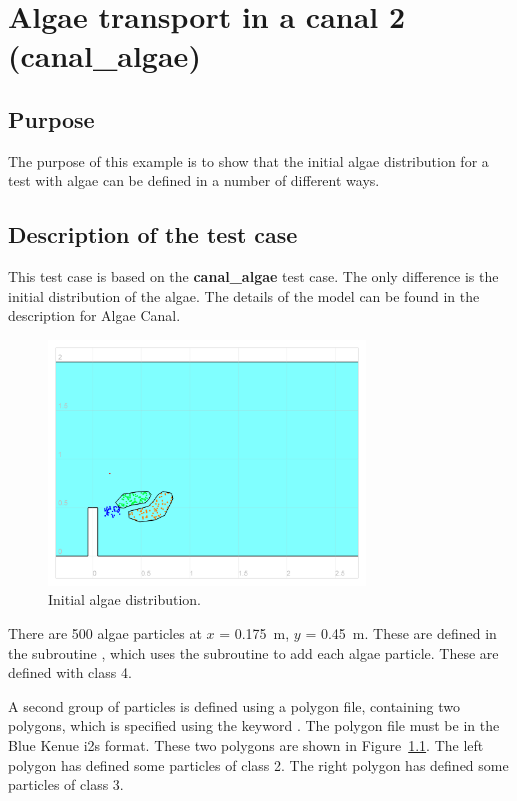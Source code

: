 \chapter{Algae transport in a canal 2 (canal\_algae)}

\section{Purpose}

The purpose of this example is to show that the initial algae distribution for a
test with algae can be defined in a number of different ways.

\section{Description of the test case}

This test case is based on the \textbf{canal\_algae} test case.
The only difference is the initial distribution of the algae.
The details of the model can be found in the description for Algae Canal.

\begin{figure}[h]
  \begin{center}
    \includegraphics[width=0.75\textwidth]{./img/canal_algae_initial_02}
  \end{center}
  \caption{Initial algae distribution.}
  \label{fig:exp_init}
\end{figure}

There are 500 algae particles at $x$ = 0.175~m, $y$ = 0.45~m.
These are defined in the subroutine , which uses the
subroutine  to add each algae particle.
These are defined with class 4.

\smallskip
A second group of particles is defined using a polygon file, containing two
polygons, which is specified using the keyword
.
The polygon file must be in the Blue Kenue i2s format.
These two polygons are shown in Figure~\ref{fig:exp_init}.
The left polygon has defined some particles of class 2.
The right polygon has defined some particles of class 3.

